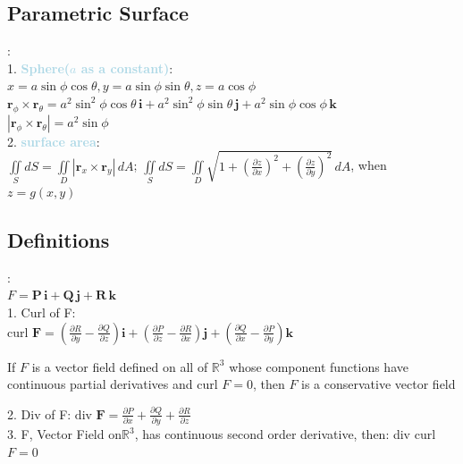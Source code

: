 \documentclass[twocolumn]{article}
\newcommand{\method}[1]{\textbf{\textcolor{lightblue}{#1}}}
\newcommand{\sectionspace}{\vspace*{1em}}
\begin{document}
\subsection{Parametric Surface}
:\\
1. \method{\textbf{Sphere($a$ as a constant)}}:\\
$x = a \sin \phi \cos \theta, y = a \sin \phi \sin \theta, z = a \cos \phi$\\
$\mathbf{r}_\phi \times \mathbf{r}_\theta = a^2 \sin^2 \phi \cos \theta \, \mathbf{i} + a^2 \sin^2 \phi \sin \theta \, \mathbf{j} + a^2 \sin \phi \cos \phi \, \mathbf{k}$\\
$|\mathbf{r}_\phi \times \mathbf{r}_\theta| = a^2 \sin \phi$\\

2. \method{surface area}:\\
$\iint\limits_S dS = \iint\limits_D \left| \mathbf{r}_x \times \mathbf{r}_y\right| \, dA$; 
$\iint\limits_S dS = \iint\limits_D \sqrt{1 + (\frac{\partial{z}}{\partial{x}})^2 + (\frac{\partial{z}}{\partial{y}})^2} \, dA$, when $z = g(x,y)$

\sectionspace


\subsection{Definitions}
:\\
$F = \mathbf{P} \, \mathbf{i} + \mathbf{Q} \, \mathbf{j} + \mathbf{R} \, \mathbf{k}$\\
1. Curl of F: \\
$\text{curl } \mathbf{F} = \left( \frac{\partial R}{\partial y} - \frac{\partial Q}{\partial z} \right) \mathbf{i} 
+ \left( \frac{\partial P}{\partial z} - \frac{\partial R}{\partial x} \right) \mathbf{j} 
+ \left( \frac{\partial Q}{\partial x} - \frac{\partial P}{\partial y} \right) \mathbf{k}$\\

\sectionspace


If $F$ is a vector field defined on all of $\mathbb{R}^3$ whose component functions have continuous partial derivatives and curl $F = 0$, then $F$ is a conservative vector field\\

\sectionspace


2. Div of F: $\text{div } \mathbf{F} = \frac{\partial P}{\partial x} + \frac{\partial Q}{\partial y} + \frac{\partial R}{\partial z}$\\

3. F,  Vector Field on$\mathbb{R}^3$, has continuous second order derivative, then: div curl $F = 0 $\\
\end{document}
